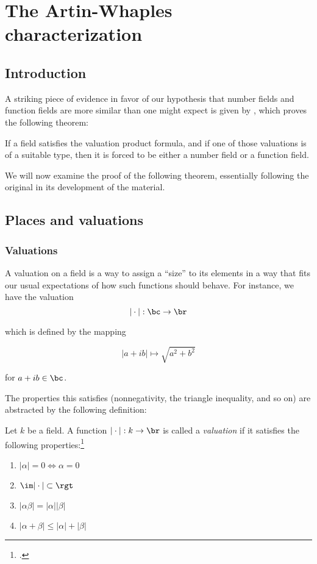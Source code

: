\chapter{The Artin-Whaples characterization}
\section{Introduction}
\label{sec:orgheadline1}

A striking piece of evidence in favor of our hypothesis that number fields and
function fields are more similar than one might expect is given by
\cite{artinwhaples}, which proves the following theorem:

\begin{thm}
  \label{thm:maintheorem}
  If a field satisfies the valuation product formula, and if one of those
  valuations is of a suitable type, then it is forced to be either a number
  field or a function field.
\end{thm}

We will now examine the proof of the following theorem, essentially following
the original in its development of the material.

\section{Places and valuations}
\label{sec:orgheadline6}

\subsection{Valuations}
\label{sec:valuations}

A valuation on a field is a way to assign a ``size'' to its elements in a way
that fits our usual expectations of how such functions should behave. For
instance, we have the valuation
\[ |\cdot| : \bc \to \br \]

which is defined by the mapping

\[ |a + ib| \mapsto \sqrt{a^2 + b^2} \]

for $a+ib\in\bc$.

The properties this satisfies (nonnegativity, the triangle inequality, and so
on) are abstracted by the following definition:

\begin{defn}
  Let $k$ be a field. A function $|\cdot|: k\to\br$ is called a
  \textit{valuation} if it satisfies the following properties:\footcite[section
  1]{artinwhaples}
  \begin{enumerate}
  \item $|\alpha| = 0 \iff \alpha = 0$
  \item $\im |\cdot|\subset \rgt$
  \item $|\alpha\beta| = |\alpha||\beta|$
  \item $|\alpha + \beta| \leq |\alpha| + |\beta|$
  \end{enumerate}
\end{defn}

